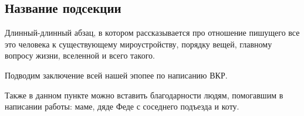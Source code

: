 \documentclass[14pt, bachelor]{disser}
\begin{document}
\subsection{Название подсекции}

Длинный-длинный абзац, в котором рассказывается про отношение пишущего все это человека к существующему мироустройству, порядку вещей, главному вопросу жизни, вселенной и всего такого.




\conclusion

Подводим заключение всей нашей эпопее по написанию ВКР.

Также в данном пункте можно вставить благодарности людям, помогавшим в написании работы: маме, дяде Феде с соседнего подъезда и коту.



\end{document}
